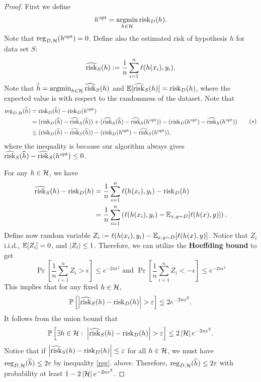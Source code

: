 \documentclass[a4paper]{article}
\begin{document}
\begin{proof}
{
  \newcommand{\hopt}{h^{\text{opt}}}
  First we define
  \[
    \hopt = \argmin_{h \in \hcal} \risk_D (h).
  \]
  Note that $\reg_{D, \hcal}(\hopt) = 0$. Define also the
  estimated risk of hypothesis $h$ for data set $S$:
  \[
  \widehat{\operatorname{risk}}_S (h) := \frac{1}{n} \sum_{i=1}^n \ell(h(x_i),
  y_i).
  \]
  Note that $\widehat{h} = \operatorname*{argmin}_{h \in \mathcal{H}}
  \widehat{\operatorname{risk}}_S (h)$ and $\mathbb{E}[\widehat{\operatorname{risk}}_S (h)] =
  \operatorname{risk}_D(h)$, where the expected value is with respect to
  the randomness of the dataset. Note that
  \begin{equation*}
    \begin{aligned}
      \reg_{D, \hcal} (\hat{h})
      &= \risk_D (\hat{h}) - \risk_D (\hopt) \\
      &= (\risk_D (\hat{h}) - \hat{\risk}_S (\hat{h}))
      + (\hat{\risk}_S (\hat{h}) - \hat{\risk}_S (\hopt))
      - (\risk_D (\hopt) - \hat{\risk}_S (\hopt))  \\
      &\leq (\risk_D (\hat{h}) - \hat{\risk}_S (\hat{h}))
      - (\risk_D (\hopt) - \hat{\risk}_S (\hopt)),
    \end{aligned}
    \tag{$*$}
    \label{reg}
  \end{equation*}
  where the inequality is because our algorithm
  always gives
  $\hat{\risk}_S (\hat{h}) - \hat{\risk}_S (\hopt) \leq 0$.

  For any $h \in \mathcal{H}$, we have
  \[
  \begin{aligned}
    \widehat{\operatorname{risk}}_S (h) - \operatorname{risk}_D(h)
    &= \frac{1}{n} \sum_{i=1}^n \ell(h(x_i), y_i)
    - \operatorname{risk}_D (h) \\
    &= \frac{1}{n} \sum_{i=1}^n \left(
      \ell(h(x_i), y_i) - \mathbb{E}_{x, y \sim D}
      [\ell(h(x), y)]
     \right).
  \end{aligned}
  \]
  Define now random variable $Z_i := \ell(h(x_i), y_i) -
  \mathbb{E}_{x, y \sim D} [\ell(h(x), y)]$. Notice that $Z_i$
  i.i.d., $\mathbb{E}[Z_i] = 0$, and $\left\lvert Z_i\right\rvert \leq 1$. Therefore,
  we can utilize the \textbf{Hoeffding bound} to get
  \[
  \Pr \left[ \frac{1}{n} \sum_{i=1}^n Z_i > \epsilon \right]
  \leq e^{- 2 n \epsilon^2} \text{ and }
  \Pr \left[ \frac{1}{n} \sum_{i=1}^n Z_i < -\epsilon \right]
  \leq e^{- 2 n \epsilon^2}
  \]
  This implies that for any fixed $h \in \mathcal{H}$,
  \[
  \mathbb{P} \left[ \left\lvert \widehat{\operatorname{risk}}_S(h) - \operatorname{risk}_D(h)\right\rvert > \varepsilon
  \right] \leq 2 e^{-2 n \varepsilon^2}.
  \]
  It follows from the union bound that
  \[
  \mathbb{P} \left[ \exists h \in \mathcal{H}: \;
  \left\lvert \widehat{\operatorname{risk}}_S(h) - \operatorname{risk}_D(h)\right\rvert > \varepsilon \right]
  \leq 2 \left\lvert \mathcal{H}\right\rvert e^{- 2 n \varepsilon^2}.
  \]
  Notice that if
  $\left\lvert \widehat{\operatorname{risk}}_S (h) - \operatorname{risk}_D (h)\right\rvert \leq \varepsilon$
  for all $h \in \mathcal{H}$, we must have $\operatorname{reg}_{D, \mathcal{H}}
  (\widehat{h}) \leq 2 \varepsilon$ by inequality \eqref{reg}.
  above. Therefore,
  $\operatorname{reg}_{D, \mathcal{H}} (\widehat{h}) \leq 2 \varepsilon$ with probability at least
  $1 - 2 \left\lvert \mathcal{H}\right\rvert e^{- 2 n \varepsilon^2}$.
}
\end{proof}
\end{document}
